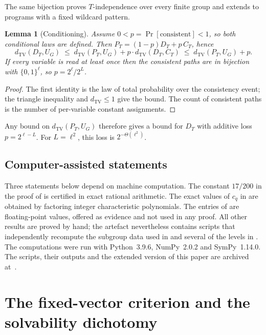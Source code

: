 \documentclass[11pt]{amsart}
\newtheorem{lemma}[lemma]{Lemma}
\theoremstyle{definition}
\theoremstyle{remark}
\theoremstyle{plain}
\theoremstyle{plain}
\numberwithin{equation}{section}
\newcommand{\dtv}{d_{\mathrm{TV}}}
\begin{document}
The same bijection proves $T$-independence over every finite group and
extends to programs with a fixed wildcard pattern.

\begin{lemma}[Conditioning]
\label{lem:conditioning}
Assume $0<p=\Pr[\text{consistent}]<1$, so both conditional laws are defined. Then $P_T=(1-p)D_T+p\,C_T$, hence
\[
\dtv(D_T,U_G)\;\le\;\dtv(P_T,U_G)+p\cdot\dtv(D_T,C_T)\;\le\;\dtv(P_T,U_G)+p .
\]
If every variable is read at least once then the consistent paths are in bijection with
$\{0,1\}^\ell$, so $p=2^\ell/2^L$.
\end{lemma}

\begin{proof}
The first identity is the law of total probability over the consistency event; the
triangle inequality and $\dtv\le1$ give the bound. The count of consistent paths is the
number of per-variable constant assignments.
\end{proof}

Any bound on $\dtv(P_T,U_G)$ therefore gives a bound for $D_T$ with additive
loss $p=2^{\ell-L}$. For $L=\ell^2$, this loss is
$2^{-\Theta(\ell^2)}$.

\subsection{Computer-assisted statements}
\label{sec:computation}

Three statements below depend on machine computation. The constant
$17/200$ in the proof of  is certified in
exact rational arithmetic. The exact values of $c_q$ in
 are obtained by factoring integer characteristic
polynomials. The entries of  are
floating-point values, offered as evidence and not used in any proof.
All other results are proved by hand; the artefact nevertheless contains
scripts that independently recompute the subgroup data used in
and several of the levels in . The computations were run
with Python~3.9.6, NumPy~2.0.2 and SymPy~1.14.0. The scripts, their
outputs and the extended version of this paper are archived
at~\cite{ZermenoExtended}.

\newpage
\section{The fixed-vector criterion and the solvability dichotomy}
\label{sec:criterion}
\end{document}
